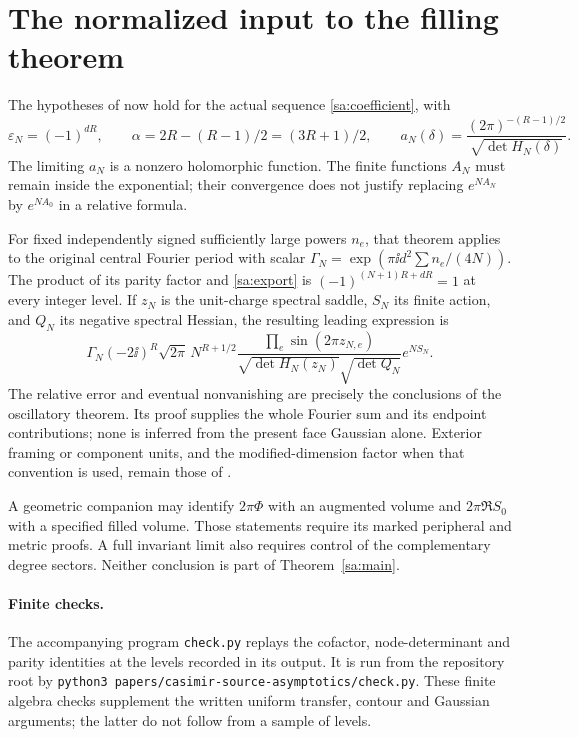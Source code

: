 \section{The normalized input to the filling theorem}\label{cs:filling}
The hypotheses of \cite[Theorem 1.1]{Oscillatory} now hold for the
actual sequence \eqref{sa:coefficient}, with
\begin{equation}\label{sa:export}
 \varepsilon_N=(-1)^{dR},\qquad
 \alpha=2R-(R-1)/2=(3R+1)/2,\qquad
 a_N(\delta)=\frac{(2\pi)^{-(R-1)/2}}{\sqrt{\det H_N(\delta)}}.
\end{equation}
The limiting $a_N$ is a nonzero holomorphic function. The finite
functions $A_N$ must remain inside the exponential; their convergence
does not justify replacing $e^{NA_N}$ by $e^{NA_0}$ in a relative formula.

For fixed independently signed sufficiently large powers $n_e$, that
theorem applies to the original central Fourier period with scalar
$\Gamma_N=\exp(\pi\ii d^2\sum n_e/(4N))$. The product of its parity
factor and \eqref{sa:export} is
$(-1)^{(N+1)R+dR}=1$ at every integer level. If $z_N$ is the
unit-charge spectral saddle, $S_N$ its finite action, and $Q_N$ its
negative spectral Hessian, the resulting leading expression is
\[
 \Gamma_N(-2\ii)^R\sqrt{2\pi}\,N^{R+1/2}
 \frac{\prod_e\sin(2\pi z_{N,e})}
       {\sqrt{\det H_N(z_N)}\sqrt{\det Q_N}}e^{NS_N}.
\]
The relative error and eventual nonvanishing are precisely the
conclusions of the oscillatory theorem. Its proof supplies the whole
Fourier sum and its endpoint contributions; none is inferred from the present
face Gaussian alone. Exterior framing or component units, and the
modified-dimension factor when that convention is used, remain those
of \cite{FinitePaper}.

A geometric companion may identify $2\pi\Phi$ with an augmented volume
and $2\pi\Re S_0$ with a specified filled volume. Those statements
require its marked peripheral and metric proofs. A full invariant
limit also requires control of the complementary degree sectors.
Neither conclusion is part of Theorem~\ref{sa:main}.


\paragraph{Finite checks.}
The accompanying program \texttt{check.py} replays the cofactor,
node-determinant and parity identities at the levels recorded in its
output. It is run from the repository root by
\texttt{python3 papers/casimir-source-asymptotics/check.py}.
These finite algebra checks supplement the written uniform transfer,
contour and Gaussian arguments; the latter do not follow from a
sample of levels.
